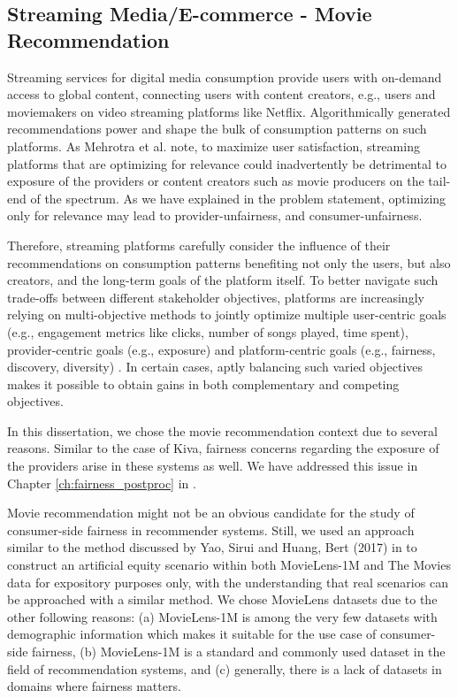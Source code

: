     \subsection{Streaming Media/E-commerce - Movie Recommendation}

        Streaming services for digital media consumption provide users with on-demand access to global content, connecting users with content creators, e.g., users and moviemakers on video streaming platforms like Netflix. Algorithmically generated recommendations power and shape the bulk of consumption patterns on such platforms. As Mehrotra et al. \cite{Mehrotra2018Towards} note, to maximize user satisfaction, streaming platforms that are optimizing for relevance could inadvertently be detrimental to exposure of the providers or content creators such as movie producers on the tail-end of the spectrum. As we have explained in the problem statement, optimizing only for relevance may lead to provider-unfairness, and consumer-unfairness.
        
        Therefore, streaming platforms carefully consider the influence of their recommendations on consumption patterns benefiting not only the users, but also creators, and the long-term goals of the platform itself. To better navigate such trade-offs between different stakeholder objectives, platforms are increasingly relying on multi-objective methods to jointly optimize multiple user-centric goals (e.g., engagement metrics like clicks, number of songs played, time spent), provider-centric goals (e.g., exposure) and platform-centric goals (e.g., fairness, discovery, diversity) \cite{mehrotra2020bandit}. In certain cases, aptly balancing such varied objectives makes it possible to obtain gains in both complementary and competing objectives.
        
        In this dissertation, we chose the movie recommendation context due to several reasons. Similar to the case of Kiva, fairness concerns regarding the exposure of the providers arise in these systems as well. We have addressed this issue in Chapter \ref{ch:fairness_postproc} in \cite{sonboli2020opportunistic,liu2019farpfar}.
        
        
        Movie recommendation might not be an obvious candidate for the study of consumer-side fairness in recommender systems. Still, we used an approach similar to the method discussed by Yao, Sirui and Huang, Bert (2017) in \cite{yao2017beyond} to construct an artificial equity scenario within both MovieLens-1M and The Movies data for expository purposes only, with the understanding that real scenarios can be approached with a similar method. We chose MovieLens datasets due to the other following reasons: (a) MovieLens-1M is among the very few datasets with demographic information which makes it suitable for the use case of consumer-side fairness, (b) MovieLens-1M is a standard and commonly used dataset in the field of recommendation systems, and (c) generally, there is a lack of datasets in domains where fairness matters.


